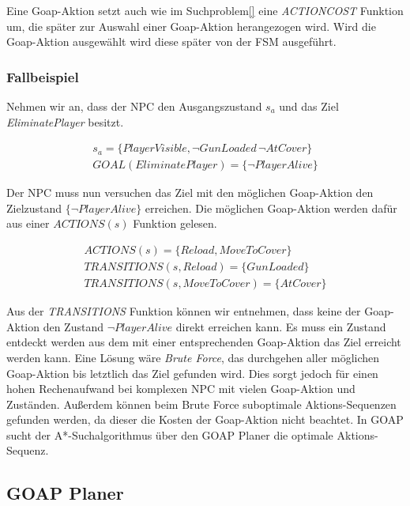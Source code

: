 Eine Goap-Aktion setzt auch wie im Suchproblem\ref{} eine \textit{ACTIONCOST} Funktion um, die sp\"{a}ter zur Auswahl einer Goap-Aktion herangezogen wird. Wird die Goap-Aktion ausgew\"{a}hlt wird diese sp\"{a}ter von der FSM ausgef\"{u}hrt.


\subsubsection{Fallbeispiel}
\label{chap:goap action beispiel}

Nehmen wir an, dass der NPC den Ausgangszustand $s_a$ und das Ziel \textit{EliminatePlayer} besitzt.

\begin{align}
	s_a = \{\textit{PlayerVisible}, \lnot \textit{GunLoaded}\, \lnot \textit{AtCover}\} \\
	\textit{GOAL}(\textit{EliminatePlayer}) = \{\lnot \textit{PlayerAlive}\}
\end{align}


Der NPC muss nun versuchen das Ziel mit den m\"{o}glichen Goap-Aktion den Zielzustand $\{\lnot \textit{PlayerAlive}\}$ erreichen. Die m\"{o}glichen Goap-Aktion werden daf\"{u}r aus einer $\textit{ACTIONS}(s)$ Funktion gelesen.

\begin{align}
	\textit{ACTIONS}(s) = \{\textit{Reload}, \textit{MoveToCover}\} \\
	\textit{TRANSITIONS}(s,\textit{Reload}) = \{\textit{GunLoaded}\} \\
	\textit{TRANSITIONS}(s,\textit{MoveToCover}) = \{\textit{AtCover}\}
\end{align}


Aus der \textit{TRANSITIONS} Funktion k\"{o}nnen wir entnehmen, dass keine der Goap-Aktion den Zustand $\lnot \textit{PlayerAlive}$ direkt erreichen kann. Es muss ein Zustand entdeckt werden aus dem mit einer entsprechenden Goap-Aktion das Ziel erreicht werden kann. Eine L\"{o}sung w\"{a}re \textit{Brute Force}, das durchgehen aller m\"{o}glichen Goap-Aktion bis letztlich das Ziel gefunden wird. Dies sorgt jedoch f\"{u}r einen hohen Rechenaufwand bei komplexen NPC mit vielen Goap-Aktion und Zust\"{a}nden. Au\ss{}erdem k\"{o}nnen beim Brute Force suboptimale Aktions-Sequenzen gefunden werden, da dieser die Kosten der Goap-Aktion nicht beachtet. In GOAP sucht der A*-Suchalgorithmus \"{u}ber den GOAP Planer die optimale Aktions-Sequenz.


\subsection{GOAP Planer}
\label{chap:goap planer}

